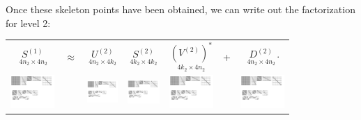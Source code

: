 \documentclass{sfuthesis}
\begin{document}
Once these skeleton points have been obtained, we can write out the factorization for level 2: 
\begin{center}
	\begin{tabular}[b]{ccccccc}
$\underset{ \ 4n_2 \times 4n_2}{S^{(1)}}$ & $\approx$ & $ \underset{ \ 4n_2 \times 4k_2 \ }{U^{(2)}}$  &  $\underset{ \ 4k_2 \times 4k_2 \ } {S^{(2)}}$ & $\underset{ \ 4k_2 \times 4n_2 \ } {{(V^{(2)})}^*}$& + &$\underset{ \ 4n_2 \times 4n_2 \ }{D^{(2)}}$. \\ [.4cm]
	\includegraphics[width=1.68cm]{BFRecLev2S1} & & \includegraphics[width=1.15cm]{BFRecLev2U2} & \includegraphics[width=1.2cm]{BFRecLev2S2} &\vspace{0.2cm}\includegraphics[width=1.68cm]{BFRecLev2V2} &  &  \includegraphics[width=1.68cm]{BFRecLev2D2} 
	\end{tabular}
\end{center}

\end{document}
